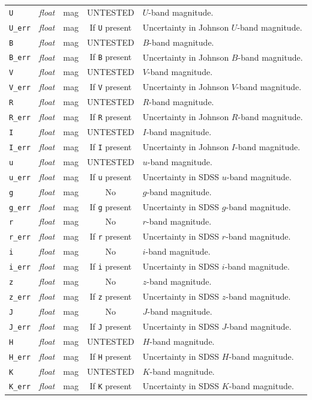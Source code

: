 \documentclass{report}
\begin{document}
\begin{center}
\begin{longtable}{lllcp{3in}}
\verb|U| & {\it float} & mag & UNTESTED & $U$-band magnitude. \\
\verb|U_err| & {\it float} & mag & If \verb|U| present & Uncertainty in Johnson $U$-band magnitude. \\
\verb|B| & {\it float} & mag & UNTESTED & $B$-band magnitude. \\
\verb|B_err| & {\it float} & mag & If \verb|B| present & Uncertainty in Johnson $B$-band magnitude. \\
\verb|V| & {\it float} & mag & UNTESTED & $V$-band magnitude. \\
\verb|V_err| & {\it float} & mag & If \verb|V| present & Uncertainty in Johnson $V$-band magnitude. \\
\verb|R| & {\it float} & mag & UNTESTED & $R$-band magnitude. \\
\verb|R_err| & {\it float} & mag & If \verb|R| present & Uncertainty in Johnson $R$-band magnitude. \\
\verb|I| & {\it float} & mag & UNTESTED & $I$-band magnitude. \\
\verb|I_err| & {\it float} & mag & If \verb|I| present & Uncertainty in Johnson $I$-band magnitude. \\
\verb|u| & {\it float} & mag & UNTESTED & $u$-band magnitude. \\
\verb|u_err| & {\it float} & mag & If \verb|u| present & Uncertainty in SDSS $u$-band magnitude. \\
\verb|g| & {\it float} & mag & No & $g$-band magnitude. \\
\verb|g_err| & {\it float} & mag & If \verb|g| present & Uncertainty in SDSS $g$-band magnitude. \\
\verb|r| & {\it float} & mag & No & $r$-band magnitude. \\
\verb|r_err| & {\it float} & mag & If \verb|r| present & Uncertainty in SDSS $r$-band magnitude. \\
\verb|i| & {\it float} & mag & No & $i$-band magnitude. \\
\verb|i_err| & {\it float} & mag & If \verb|i| present & Uncertainty in SDSS $i$-band magnitude. \\
\verb|z| & {\it float} & mag & No & $z$-band magnitude. \\
\verb|z_err| & {\it float} & mag & If \verb|z| present & Uncertainty in SDSS $z$-band magnitude. \\
\verb|J| & {\it float} & mag & No & $J$-band magnitude. \\
\verb|J_err| & {\it float} & mag & If \verb|J| present & Uncertainty in SDSS $J$-band magnitude. \\
\verb|H| & {\it float} & mag & UNTESTED & $H$-band magnitude. \\
\verb|H_err| & {\it float} & mag & If \verb|H| present & Uncertainty in SDSS $H$-band magnitude. \\
\verb|K| & {\it float} & mag & UNTESTED & $K$-band magnitude. \\
\verb|K_err| & {\it float} & mag & If \verb|K| present & Uncertainty in SDSS $K$-band magnitude. \\
\end{longtable}
\end{center}
\end{document}
